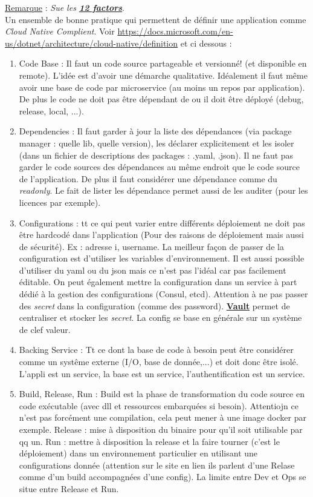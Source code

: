 \documentclass[a4paper,12pt,twoside]{article}
\newcommand{\urlcolor}{magenta}  %
\newcommand{\keycolor}{purple} %
\newcommand{\rem}[2]{\noindent\underline{Remarque} : \textit{#1}.\\ \indent #2}
\newcommand{\keyref}[2]{\hypersetup{urlcolor=\keycolor} \href{#1}{\textbf{#2}}\hypersetup{urlcolor=\urlcolor}}
\begin{document}
\rem{Sue les \keyref{https://12factor.net/}{12 factors}}{Un ensemble de bonne pratique qui permettent de définir une application comme \textit{Cloud Native Complient}. Voir \url{https://docs.microsoft.com/en-us/dotnet/architecture/cloud-native/definition} et ci dessous : 
\begin{enumerate}
\item Code Base : Il faut un code source partageable et versionné! (et disponible en remote). L'idée est d'avoir une démarche qualitative. Idéalement il faut même avoir une base de code par microservice (au moins un repos par application). De plus le code ne doit pas être dépendant de ou il doit être déployé (debug, release, local, ...).
\item Dependencies : Il faut garder à jour la liste des dépendances (via package manager : quelle lib, quelle version), les déclarer explicitement et les isoler (dans un fichier de descriptions des packages : .yaml, .json). Il ne faut pas garder le code sources des dépendances au même endroit que le code source de l'application. De plus il faut considérer une dépendance comme du \textit{readonly}. Le fait de lister les dépendance permet aussi de les auditer (pour les licences par exemple).
\item Configurations : tt ce qui peut varier entre différents déploiement ne doit pas être hardcodé dans l'application (Pour des raisons de déploiement mais aussi de sécurité). Ex : adresse i, username. La meilleur façon de passer de la configuration est d'utiliser les variables d'environnement. Il est aussi possible d'utiliser du yaml ou du json mais ce n'est pas l'idéal car pas facilement éditable. On peut également mettre la configuration dans un service à part dédié à la gestion des configurations (Consul, etcd). Attention à ne pas passer des \textit{secret} dans la configuration (comme des password). \keyref{https://www.vaultproject.io/}{Vault} permet de centraliser et stocker les \textit{secret}. La config se base en générale sur un système de clef valeur.
\item Backing Service : Tt ce dont la base de code à besoin peut être considérer comme un systême externe (I/O, base de donnée,...) et doit donc être isolé. L'appli est un service, la base est un service, l'authentification est un service.
\item Build, Release, Run : Build est la phase de transformation du code source en code exécutable (avec dll et ressources embarquées si besoin). Attentiojn ce n'est pas forcément une compilation, cela peut mener à une image docker par exemple.  Release : mise à disposition du binaire pour qu'il soit utilisable par qq un. Run : mettre à disposition la release et la faire tourner (c'est le déploiement) dans un environnement particulier en utilisant une configurations donnée (attention sur le site en lien ils parlent d'une Relase comme d'un build accompagnées d'une config). La limite entre Dev et Ops se situe entre Release et Run.

\end{enumerate}}
\end{document}
